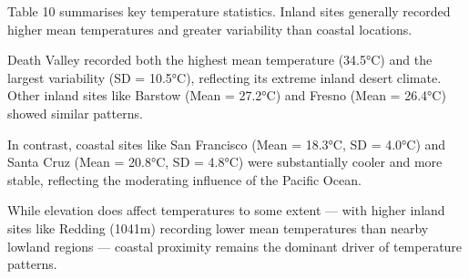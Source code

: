 \documentclass[
  11pt,
]{article}
\begin{document}
Table 10 summarises key temperature statistics. Inland sites generally
recorded higher mean temperatures and greater variability than coastal
locations.

Death Valley recorded both the highest mean temperature (34.5°C) and the
largest variability (SD = 10.5°C), reflecting its extreme inland desert
climate. Other inland sites like Barstow (Mean = 27.2°C) and Fresno
(Mean = 26.4°C) showed similar patterns.

In contrast, coastal sites like San Francisco (Mean = 18.3°C, SD =
4.0°C) and Santa Cruz (Mean = 20.8°C, SD = 4.8°C) were substantially
cooler and more stable, reflecting the moderating influence of the
Pacific Ocean.

While elevation does affect temperatures to some extent --- with higher
inland sites like Redding (1041m) recording lower mean temperatures than
nearby lowland regions --- coastal proximity remains the dominant driver
of temperature patterns.
\end{document}
